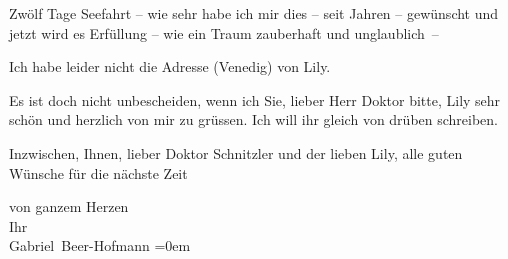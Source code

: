 \pstart
           Zwölf Tage Seefahrt – wie sehr habe ich mir dies – seit Jahren – gewünscht und jetzt
               wird es Erfüllung – wie ein Traum zauberhaft und unglaublich –\pend
           
\pstart
           Ich habe leider nicht die Adresse (Venedig) von
                  Lily.\pend
           
\pstart
           Es ist doch nicht unbescheiden, wenn ich Sie, lieber Herr Doktor {\pb}bitte, Lily sehr schön und herzlich von mir zu grüssen. Ich will ihr
               gleich von drüben schreiben.\pend
           
\pstart
           Inzwischen, Ihnen, lieber Doktor Schnitzler und der lieben Lily, alle guten Wünsche für die nächste Zeit\pend
           
\pstart
           von ganzem Herzen{\\[\baselineskip]}Ihr{\\[\baselineskip]}\spacefill\mbox{Gabriel Beer-Hofmann}\pend
           \leftskip=0em{}\endnumbering{}  \newcommand{\dateiname}{L02479}\newcommand{\titel}{Gabriel Beer-Hofmann an Arthur Schnitzler, 12. 10. 1926}\newcommand{\editorInnen}{Martin Anton Müller und Gerd-Hermann Susen}
